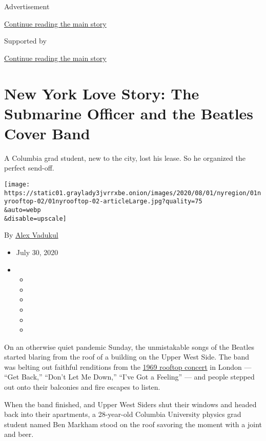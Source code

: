 Advertisement

\protect\hyperlink{after-top}{Continue reading the main story}

Supported by

\protect\hyperlink{after-sponsor}{Continue reading the main story}

\hypertarget{new-york-love-story-the-submarine-officer-and-the-beatles-cover-band}{%
\section{New York Love Story: The Submarine Officer and the Beatles
Cover
Band}\label{new-york-love-story-the-submarine-officer-and-the-beatles-cover-band}}

A Columbia grad student, new to the city, lost his lease. So he
organized the perfect send-off.

\texttt{[image: https://static01.graylady3jvrrxbe.onion/images/2020/08/01/nyregion/01nyrooftop-02/01nyrooftop-02-articleLarge.jpg?quality=75\\\&auto=webp\\\&disable=upscale]}

By \href{https://www.nytimes3xbfgragh.onion/by/alex-vadukul}{Alex
Vadukul}

\begin{itemize}
\item
  July 30, 2020
\item
  \begin{itemize}
  \item
  \item
  \item
  \item
  \item
  \item
  \end{itemize}
\end{itemize}

On an otherwise quiet pandemic Sunday, the unmistakable songs of the
Beatles started blaring from the roof of a building on the Upper West
Side. The band was belting out faithful renditions from the
\href{https://www.rollingstone.com/music/music-news/beatles-famous-rooftop-concert-15-things-you-didnt-know-58342/}{1969
rooftop concert} in London --- ``Get Back,'' ``Don't Let Me Down,''
``I've Got a Feeling'' --- and people stepped out onto their balconies
and fire escapes to listen.

When the band finished, and Upper West Siders shut their windows and
headed back into their apartments, a 28-year-old Columbia University
physics grad student named Ben Markham stood on the roof savoring the
moment with a joint and beer.

